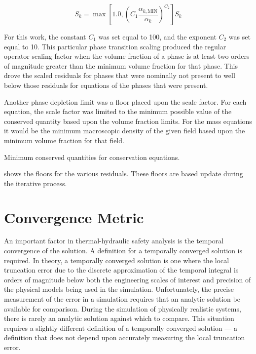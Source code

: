 \begin{equation}
\label{eqn:scaling_factor_small}
S_k = \max\left[1.0, \left(C_1 \frac{\alpha_{k,\text{MIN}}}{\alpha_k}\right)^{C_2} \right] S_k
\end{equation}

For this work, the constant $C_1$ was set equal to 100, and the exponent $C_2$ was set equal to 10.
This particular phase transition scaling produced the regular operator scaling factor when the volume fraction of a phase is at least two orders of magnitude greater than the minimum volume fraction for that phase.
This drove the scaled residuals for phases that were nominally not present to well below those residuals for equations of the phases that were present.

Another phase depletion limit was a floor placed upon the scale factor.
For each equation, the scale factor was limited to the minimum possible value of the conserved quantity based upon the volume fraction limits.
For the mass equations it would be the minimum macroscopic density of the given field based upon the minimum volume fraction for that field.

\begin{table}[ht]
\centering

\caption{Minimum conserved quantities for conservation equations.}
\label{tab:minimumConservedValues}
\end{table}

 shows the floors for the various residuals.
These floors are based update during the iterative process.

\section{Convergence Metric}
\label{sect:temporal_convergence}

An important factor in thermal-hydraulic safety analysis is the temporal convergence of the solution.
A definition for a temporally converged solution is required.
In theory, a temporally converged solution is one where the local truncation error due to the discrete approximation of the temporal integral is orders of magnitude below both the engineering scales of interest and precision of the physical models being used in the simulation.
Unfortunately, the precise measurement of the error in a simulation requires that an analytic solution be available for comparison.
During the simulation of physically realistic systems, there is rarely an analytic solution against which to compare.
This situation requires a slightly different definition of a temporally converged solution --- a definition that does not depend upon accurately measuring the local truncation error.

